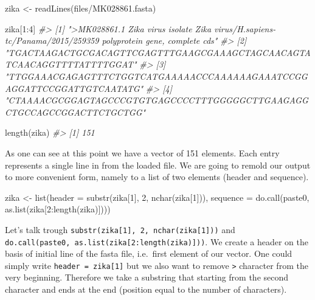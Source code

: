 \documentclass[
]{book}
\newenvironment{Shaded}{\begin{snugshade}}{\end{snugshade}}
\newcommand{\CommentTok}[1]{\textcolor[rgb]{0.56,0.35,0.01}{\textit{#1}}}
\newcommand{\DecValTok}[1]{\textcolor[rgb]{0.00,0.00,0.81}{#1}}
\newcommand{\FunctionTok}[1]{\textcolor[rgb]{0.00,0.00,0.00}{#1}}
\newcommand{\NormalTok}[1]{#1}
\newcommand{\OtherTok}[1]{\textcolor[rgb]{0.56,0.35,0.01}{#1}}
\newcommand{\SpecialCharTok}[1]{\textcolor[rgb]{0.00,0.00,0.00}{#1}}
\newcommand{\StringTok}[1]{\textcolor[rgb]{0.31,0.60,0.02}{#1}}
\begin{document}
\begin{Shaded}
\begin{Highlighting}[]
\NormalTok{zika }\OtherTok{\textless{}{-}} \FunctionTok{readLines}\NormalTok{(}\StringTok{\textquotesingle{}files/MK028861.fasta\textquotesingle{}}\NormalTok{)}

\NormalTok{zika[}\DecValTok{1}\SpecialCharTok{:}\DecValTok{4}\NormalTok{]}
\CommentTok{\#\textgreater{} [1] "\textgreater{}MK028861.1 Zika virus isolate Zika virus/H.sapiens{-}tc/Panama/2015/259359 polyprotein gene, complete cds"}
\CommentTok{\#\textgreater{} [2] "TGACTAAGACTGCGACAGTTCGAGTTTGAAGCGAAAGCTAGCAACAGTATCAACAGGTTTTATTTTGGAT"                                  }
\CommentTok{\#\textgreater{} [3] "TTGGAAACGAGAGTTTCTGGTCATGAAAAACCCAAAAAAGAAATCCGGAGGATTCCGGATTGTCAATATG"                                  }
\CommentTok{\#\textgreater{} [4] "CTAAAACGCGGAGTAGCCCGTGTGAGCCCCTTTGGGGGCTTGAAGAGGCTGCCAGCCGGACTTCTGCTGG"}

\FunctionTok{length}\NormalTok{(zika)}
\CommentTok{\#\textgreater{} [1] 151}
\end{Highlighting}
\end{Shaded}

As one can see at this point we have a vector of 151 elements. Each entry represents a single line in from the loaded file. We are going to remold our output to more convenient form, namely to a list of two elements (header and sequence).

\begin{Shaded}
\begin{Highlighting}[]
\NormalTok{zika }\OtherTok{\textless{}{-}} \FunctionTok{list}\NormalTok{(}\StringTok{\textquotesingle{}header\textquotesingle{}} \OtherTok{=} \FunctionTok{substr}\NormalTok{(zika[}\DecValTok{1}\NormalTok{], }\DecValTok{2}\NormalTok{, }\FunctionTok{nchar}\NormalTok{(zika[}\DecValTok{1}\NormalTok{])), }
             \StringTok{\textquotesingle{}sequence\textquotesingle{}} \OtherTok{=} \FunctionTok{do.call}\NormalTok{(paste0, }\FunctionTok{as.list}\NormalTok{(zika[}\DecValTok{2}\SpecialCharTok{:}\FunctionTok{length}\NormalTok{(zika)])))}
\end{Highlighting}
\end{Shaded}

Let's talk trough \texttt{substr(zika{[}1{]},\ 2,\ nchar(zika{[}1{]}))} and \texttt{do.call(paste0,\ as.list(zika{[}2:length(zika){]}))}. We create a header on the basis of initial line of the fasta file, i.e.~first element of our vector. One could simply write \texttt{\textquotesingle{}header\textquotesingle{}\ =\ zika{[}1{]}} but we also want to remove \texttt{\textgreater{}} character from the very beginning. Therefore we take a substring that starting from the second character and ends at the end (position equal to the number of characters).
\end{document}
